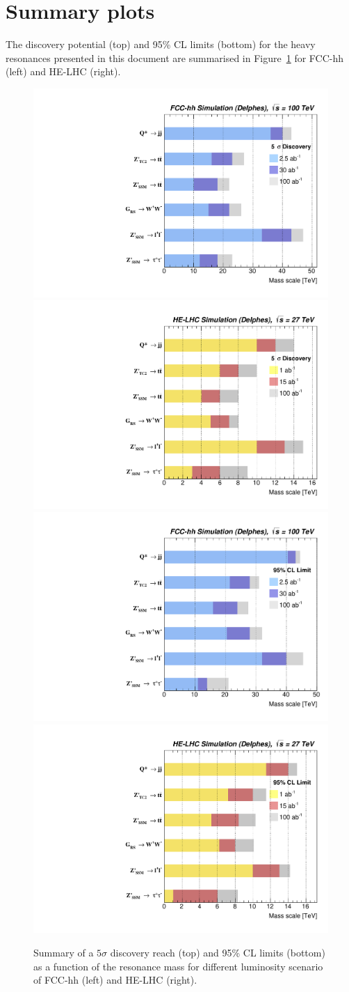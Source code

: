 \documentclass[a4paper,11pt]{article}
\begin{document}
\section{Summary plots}
The discovery potential (top) and 95\% CL limits (bottom) for the heavy resonances presented in this document are summarised in Figure~\ref{figure:resonances100:summary} for FCC-hh (left) and HE-LHC (right).
\begin{figure}[!htb]
  \centering
  \includegraphics[width=0.49\columnwidth]{Fig/summaryDisco_onlyFCChh.pdf}
  \includegraphics[width=0.49\columnwidth]{Fig/summaryDisco_onlyHELHC.pdf}
   \includegraphics[width=0.49\columnwidth]{Fig/summaryLimit_onlyFCChh.pdf}
  \includegraphics[width=0.49\columnwidth]{Fig/summaryLimit_onlyHELHC.pdf}
  \caption{Summary of a $5\sigma$ discovery reach (top) and 95\% CL limits (bottom) as a function of the resonance mass for different luminosity scenario of FCC-hh (left) and HE-LHC (right).}
  \label{figure:resonances100:summary}
\end{figure}
\end{document}

